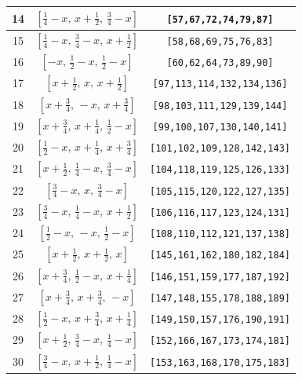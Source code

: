 \documentclass[fleqn,8pt]{jsarticle}
\begin{document}
\begin{longtable}{ccc}
14 & $\left[ \frac{1}{4} - x,\, x + \frac{1}{2},\, \frac{3}{4} - x \right]$ & {\tt [57,67,72,74,79,87]} \\ \hline
15 & $\left[ \frac{1}{4} - x,\, \frac{3}{4} - x,\, x + \frac{1}{2} \right]$ & {\tt [58,68,69,75,76,83]} \\ \hline
16 & $\left[ - x,\, \frac{1}{2} - x,\, \frac{1}{2} - x \right]$ & {\tt [60,62,64,73,89,90]} \\ \hline
17 & $\left[ x + \frac{1}{2},\, x,\, x + \frac{1}{2} \right]$ & {\tt [97,113,114,132,134,136]} \\ \hline
18 & $\left[ x + \frac{3}{4},\, - x,\, x + \frac{3}{4} \right]$ & {\tt [98,103,111,129,139,144]} \\ \hline
19 & $\left[ x + \frac{3}{4},\, x + \frac{1}{4},\, \frac{1}{2} - x \right]$ & {\tt [99,100,107,130,140,141]} \\ \hline
20 & $\left[ \frac{1}{2} - x,\, x + \frac{1}{4},\, x + \frac{3}{4} \right]$ & {\tt [101,102,109,128,142,143]} \\ \hline
21 & $\left[ x + \frac{1}{2},\, \frac{1}{4} - x,\, \frac{3}{4} - x \right]$ & {\tt [104,118,119,125,126,133]} \\ \hline
22 & $\left[ \frac{3}{4} - x,\, x,\, \frac{3}{4} - x \right]$ & {\tt [105,115,120,122,127,135]} \\ \hline
23 & $\left[ \frac{3}{4} - x,\, \frac{1}{4} - x,\, x + \frac{1}{2} \right]$ & {\tt [106,116,117,123,124,131]} \\ \hline
24 & $\left[ \frac{1}{2} - x,\, - x,\, \frac{1}{2} - x \right]$ & {\tt [108,110,112,121,137,138]} \\ \hline
25 & $\left[ x + \frac{1}{2},\, x + \frac{1}{2},\, x \right]$ & {\tt [145,161,162,180,182,184]} \\ \hline
26 & $\left[ x + \frac{3}{4},\, \frac{1}{2} - x,\, x + \frac{1}{4} \right]$ & {\tt [146,151,159,177,187,192]} \\ \hline
27 & $\left[ x + \frac{3}{4},\, x + \frac{3}{4},\, - x \right]$ & {\tt [147,148,155,178,188,189]} \\ \hline
28 & $\left[ \frac{1}{2} - x,\, x + \frac{3}{4},\, x + \frac{1}{4} \right]$ & {\tt [149,150,157,176,190,191]} \\ \hline
29 & $\left[ x + \frac{1}{2},\, \frac{3}{4} - x,\, \frac{1}{4} - x \right]$ & {\tt [152,166,167,173,174,181]} \\ \hline
30 & $\left[ \frac{3}{4} - x,\, x + \frac{1}{2},\, \frac{1}{4} - x \right]$ & {\tt [153,163,168,170,175,183]} \\ \hline

\end{longtable}
\end{document}
